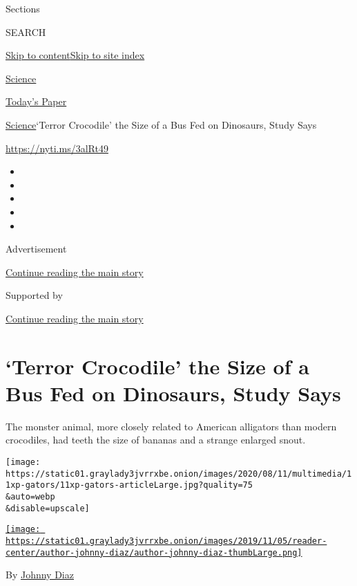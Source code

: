 Sections

SEARCH

\protect\hyperlink{site-content}{Skip to
content}\protect\hyperlink{site-index}{Skip to site index}

\href{https://www.nytimes3xbfgragh.onion/section/science}{Science}

\href{https://myaccount.nytimes3xbfgragh.onion/auth/login?response_type=cookie\&client_id=vi}{}

\href{https://www.nytimes3xbfgragh.onion/section/todayspaper}{Today's
Paper}

\href{/section/science}{Science}\textbar{}`Terror Crocodile' the Size of
a Bus Fed on Dinosaurs, Study Says

\url{https://nyti.ms/3alRt49}

\begin{itemize}
\item
\item
\item
\item
\item
\end{itemize}

Advertisement

\protect\hyperlink{after-top}{Continue reading the main story}

Supported by

\protect\hyperlink{after-sponsor}{Continue reading the main story}

\hypertarget{terror-crocodile-the-size-of-a-bus-fed-on-dinosaurs-study-says}{%
\section{`Terror Crocodile' the Size of a Bus Fed on Dinosaurs, Study
Says}\label{terror-crocodile-the-size-of-a-bus-fed-on-dinosaurs-study-says}}

The monster animal, more closely related to American alligators than
modern crocodiles, had teeth the size of bananas and a strange enlarged
snout.

\texttt{[image: https://static01.graylady3jvrrxbe.onion/images/2020/08/11/multimedia/11xp-gators/11xp-gators-articleLarge.jpg?quality=75\\\&auto=webp\\\&disable=upscale]}

\href{https://www.nytimes3xbfgragh.onion/by/johnny-diaz}{\texttt{[image: https://static01.graylady3jvrrxbe.onion/images/2019/11/05/reader-center/author-johnny-diaz/author-johnny-diaz-thumbLarge.png]}}

By \href{https://www.nytimes3xbfgragh.onion/by/johnny-diaz}{Johnny Diaz}

